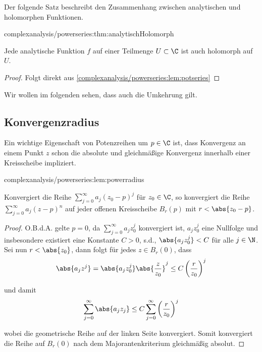 \documentclass[letterpaper,10pt,german]{jupyterBook}
\begin{document}
\par
Der folgende Satz beschreibt den Zusammenhang zwischen analytischen und holomorphen Funktionen.
\begin{theorem}{}{complexanalysis/powerseries:thm:analytischHolomorph}



\par
Jede analytische Funktion \(f\) auf einer Teilmenge \(U \subset \C\) ist auch holomorph auf \(U\).
\end{theorem}

\begin{proof}
 Folgt direkt aus \cref{complexanalysis/powerseries:lem:potseries} \end{proof}

\par
Wir wollen im folgenden sehen, dass auch die Umkehrung gilt.


\subsection{Konvergenzradius}
\label{\detokenize{complexanalysis/powerseries:konvergenzradius}}
\par
Ein wichtige Eigenschaft von Potenzreihen um \(p\in\C\) ist, dass Konvergenz an einem Punkt \(z\) schon die absolute und gleichmäßige Konvergenz innerhalb einer Kreisscheibe impliziert.
\begin{lemma}{}{complexanalysis/powerseries:lem:powerradius}



\par
Konvergiert die Reihe \(\sum_{j=0}^\infty a_j (z_0-p)^j\) für \(z_0\in\C\), so konvergiert die Reihe \(\sum_{j=0}^\infty a_j (z-p)^n\) auf jeder offenen Kreisscheibe \(B_r(p)\) mit \(r< \abs{z_0 - p}\).
\end{lemma}

\begin{proof}
 O.B.d.A. gelte \(p=0\), da \(\sum_{j=0}^\infty a_j z_0^j\) konvergiert ist, \(a_j z_0^j\) eine Nullfolge und insbesondere existiert eine Konstante \(C>0\), s.d., \(\abs{a_j z_0^j}< C\) für alle \(j\in\N\). Sei nun \(r<\abs{z_0}\), dann folgt für jedes \(z\in B_r(0)\), dass
\begin{align*}
\abs{a_j z^j} = \abs{a_j z_0^j}\abs{\frac{z}{z_0}}^j\leq C \left(\frac{r}{z_0}\right)^j
\end{align*}
\par
und damit
\begin{align*}
\sum_{j=0}^\infty \abs{a_j z_j} \leq C \sum_{j=0}^\infty \left(\frac{r}{z_0}\right)^j
\end{align*}
\par
wobei die geometrische Reihe auf der linken Seite konvergiert. Somit konvergiert die Reihe auf \(B_r(0)\) nach dem Majorantenkriterium gleichmäßig absolut.
\end{proof}
\end{document}
